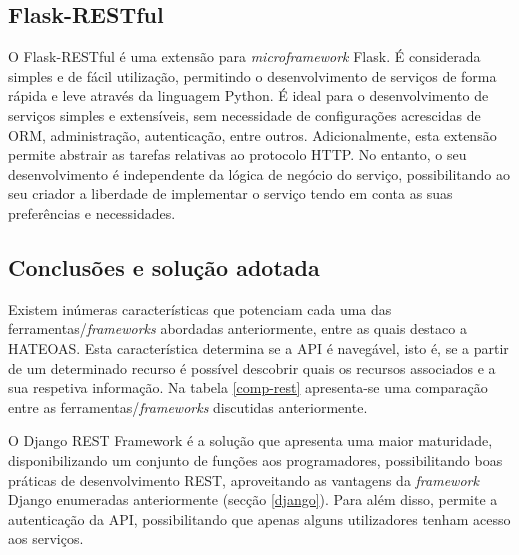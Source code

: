  





\subsection{Flask-RESTful}

O Flask-RESTful é uma extensão para \textit{microframework} Flask. É considerada simples e de fácil utilização, permitindo o desenvolvimento de serviços de forma rápida e leve através da linguagem Python. É ideal para o desenvolvimento de serviços simples e extensíveis, sem necessidade de configurações acrescidas de \ac{ORM}, administração,  autenticação, entre outros\cite{Flask-RESTful2017}.  Adicionalmente, esta extensão permite abstrair as tarefas relativas ao protocolo \ac{HTTP}. No entanto, o seu desenvolvimento é independente da lógica de negócio do serviço, possibilitando ao seu criador a liberdade de implementar o serviço tendo em conta as suas preferências e necessidades.  




\subsection{Conclusões e solução adotada}


Existem inúmeras características que potenciam cada uma das ferramentas/\textit{frameworks} abordadas anteriormente, entre as quais destaco a \ac{HATEOAS}. Esta característica determina se a API é  navegável, isto é, se a partir de um determinado recurso é possível descobrir quais os recursos associados e a sua respetiva informação. Na tabela \ref{comp-rest} apresenta-se uma comparação entre as ferramentas/\textit{frameworks} discutidas anteriormente. 


O Django REST Framework é a solução que apresenta uma maior maturidade, disponibilizando um conjunto de funções aos programadores, possibilitando boas práticas de desenvolvimento \ac{REST}, aproveitando as vantagens da \textit{framework} Django enumeradas anteriormente (secção \ref{django}). Para além disso, permite a autenticação da API, possibilitando que apenas alguns utilizadores tenham acesso aos serviços. 






